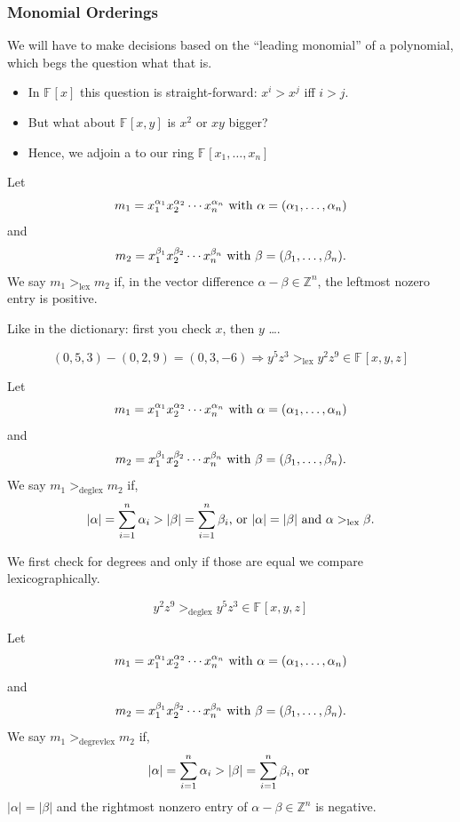 \documentclass[9pt]{beamer}
\newcommand{\memph}[1]{{\color{yellow9}{\bf #1}}\xspace}
\newcommand{\F}[1][]{\ensuremath{\mathbb{F}_{#1}}\xspace}
\newcommand{\Z}{\ensuremath{\mathbb{Z}}\xspace}
\newcommand{\gens}{\ensuremath{x_1,\dots,x_{n}}\xspace}
\begin{document}
\begin{frame}
\frametitle{Monomial Orderings} 
We will have to make decisions based on the ``leading monomial'' of a polynomial, which begs the question what that is.
\begin{itemize}
\item In $\F{}[x]$ this question is straight-forward: $x^i > x^j$ iff $i>j$.
\item But what about $\F{}[x,y]$ is $x^2$ or $xy$ bigger?
\item Hence, we adjoin a \memph{monomial ordering} to our ring $\F{}[\gens]$
\end{itemize}

\framebreak

\begin{definition}[Lexicographical]
Let $$m_1 = x_1^{\alpha_1} x_2^{\alpha_2} \cdots x_n^{\alpha_n} \textnormal{ with } \alpha = (\alpha_1,\dots,\alpha_n)$$ and $$m_2 =  x_1^{\beta_1} x_2^{\beta_2} \cdots x_n^{\beta_n} \textnormal{ with } \beta = (\beta_1,\dots,\beta_n).$$  We say $m_1 >_{\textrm{lex}} m_2$ if, in the vector difference $\alpha - \beta \in \Z^n$, the leftmost nozero entry is positive.
\end{definition}

Like in the dictionary: first you check  $x$, then $y$ \dots.

$$(0,5,3) - (0,2,9) = (0,3,-6) \Rightarrow y^5z^3 >_{\textrm{lex}} y^2z^9 \in \F{}[x,y,z]$$

\framebreak

\begin{definition}
Let $$m_1 = x_1^{\alpha_1} x_2^{\alpha_2} \cdots x_n^{\alpha_n} \textnormal{ with } \alpha = (\alpha_1,\dots,\alpha_n)$$ and $$m_2 =  x_1^{\beta_1} x_2^{\beta_2} \cdots x_n^{\beta_n} \textnormal{ with } \beta = (\beta_1,\dots,\beta_n).$$  We say $m_1 >_{\textrm{deglex}} m_2$ if, $$|\alpha|  = \sum_{i=1}^{n} \alpha_i > |\beta| = \sum_{i=1}^{n} \beta_i \textnormal{, or } |\alpha| = |\beta| \textnormal{ and } \alpha >_{\textrm{lex}} \beta.$$
\end{definition}

We first check for degrees and only if those are equal we compare lexicographically.

$$y^2z^9 >_{\textrm{deglex}} y^5z^3 \in \F{}[x,y,z]$$

\framebreak

\begin{definition}
Let $$m_1 = x_1^{\alpha_1} x_2^{\alpha_2} \cdots x_n^{\alpha_n} \textnormal{ with } \alpha = (\alpha_1,\dots,\alpha_n)$$ and $$m_2 =  x_1^{\beta_1} x_2^{\beta_2} \cdots x_n^{\beta_n} \textnormal{ with } \beta = (\beta_1,\dots,\beta_n).$$ We say $m_1 >_{\textrm{degrevlex}} m_2$ if, $$|\alpha|  = \sum_{i=1}^{n} \alpha_i > |\beta| = \sum_{i=1}^{n} \beta_i \textnormal{, or }$$ $|\alpha| = |\beta|$ and the rightmost nonzero entry of $\alpha - \beta \in \Z^n$ is negative.
\end{definition}


\end{frame}
\end{document}

